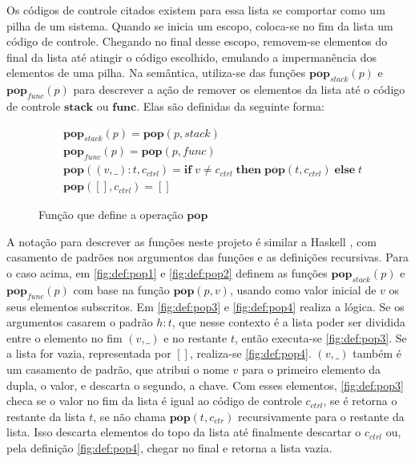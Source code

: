 Os códigos de controle citados existem para essa lista se comportar como um pilha de um sistema. Quando se inicia um escopo, coloca-se no fim da lista um código de controle. Chegando no final desse escopo, removem-se elementos do final da lista até atingir o código escolhido, emulando a impermanência dos elementos de uma pilha. Na semântica, utiliza-se das funções $\mathbf{pop}_{stack}(p)$ e $\mathbf{pop}_{func}(p)$ para descrever a ação de remover os elementos da lista até o código de controle $\mathbf{stack}$ ou $\mathbf{func}$. Elas são definidas da seguinte forma:

\begin{figure}[ht]
	\begin{align}
		&\mathbf{pop}_{stack}(p) = \mathbf{pop}(p, stack) \label{fig:def:pop1}\\
		&\mathbf{pop}_{func}(p) = \mathbf{pop}(p, func) \label{fig:def:pop2}\\
		&\mathbf{pop}((v, \_) : t, c_{ctrl}) = \mathbf{if} \; v \neq c_{ctrl} \;\mathbf{then} \; \mathbf{pop}(t, c_{ctrl}) \; \mathbf{else} \; t  \label{fig:def:pop3}\\
		&\mathbf{pop}([], c_{ctrl}) =  [] \label{fig:def:pop4}
	\end{align}
	\caption{Função que define a operação $\mathbf{pop}$}
	\label{fig:def:pop}
\end{figure}

A notação para descrever as funções neste projeto é similar a Haskell \cite{HASKELL}, com casamento de padrões nos argumentos das funções e as definições recursivas. Para o caso acima, em \ref{fig:def:pop1} e \ref{fig:def:pop2} definem as funções $\mathbf{pop}_{stack}(p)$ e $\mathbf{pop}_{func}(p)$ com base na função $\mathbf{pop}(p, v)$, usando como valor inicial de $v$ os seus elementos subscritos. Em \ref{fig:def:pop3} e \ref{fig:def:pop4} realiza a lógica. Se os argumentos casarem o padrão $h : t$, que nesse contexto é a lista poder ser dividida entre o elemento no fim $(v, \_)$ e no restante $t$, então executa-se \ref{fig:def:pop3}. Se a lista for vazia, representada por $[]$, realiza-se \ref{fig:def:pop4}. $(v,\_)$ também é um casamento de padrão, que atribui o nome $v$ para o primeiro elemento da dupla, o valor, e descarta o segundo, a chave. Com esses elementos, \ref{fig:def:pop3} checa se o valor no fim da lista é igual ao código de controle $c_{ctrl}$, se é retorna o restante da lista $t$, se não chama $\mathbf{pop}(t, c_{ctr})$ recursivamente para o restante da lista. Isso descarta elementos do topo da lista até finalmente descartar o $c_{ctrl}$ ou, pela definição \ref{fig:def:pop4}, chegar no final e retorna a lista vazia.

